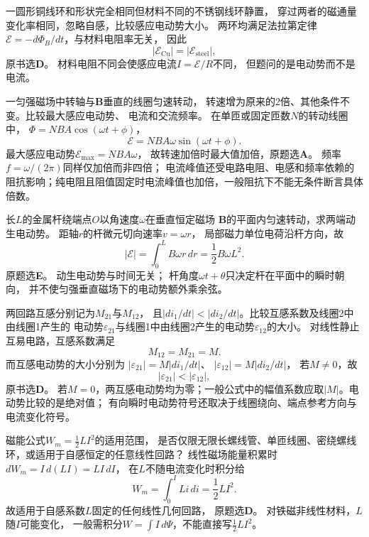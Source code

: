 \problemtext 一圆形铜线环和形状完全相同但材料不同的不锈钢线环静置，
穿过两者的磁通量变化率相同，忽略自感，比较感应电动势大小。
\workings
两环均满足法拉第定律
$\mathcal E=-d\Phi_B/dt$，与材料电阻率无关，
因此
\[
\boxed{|\mathcal E_{\mathrm{Cu}}|
=|\mathcal E_{\mathrm{steel}}|},
\]
原书选\textbf{D}。
\crosscheck 材料电阻不同会使感应电流$I=\mathcal E/R$不同，
但题问的是电动势而不是电流。

\problemtext 一匀强磁场中转轴与$\bm B$垂直的线圈匀速转动，
转速增为原来的2倍、其他条件不变。比较最大感应电动势、
电流和交流频率。
\workings
在单匝或固定匝数$N$的转动线圈中，
$\Phi=NBA\cos(\omega t+\phi)$，
\[
\mathcal E=NBA\omega\sin(\omega t+\phi).
\]
最大感应电动势$\mathcal E_{\max}=NBA\omega$，
故转速加倍时最大值加倍，原题选\textbf{A}。
\crosscheck 频率$f=\omega/(2\pi)$同样仅加倍而非四倍；
电流峰值还受电路电阻、电感和频率依赖的阻抗影响；纯电阻且阻值固定时电流峰值也加倍，一般阻抗下不能无条件断言具体倍数。

\problemtext 长$L$的金属杆绕端点$O$以角速度$\omega$在垂直恒定磁场
$\bm B$的平面内匀速转动，求两端动生电动势。
\workings
距轴$r$的杆微元切向速率$v=\omega r$，
局部磁力单位电荷沿杆方向，故
\[
|\mathcal E|=\int_0^L B\omega r\,dr
=\boxed{\frac12B\omega L^2}.
\]
原题选\textbf{E}。
\crosscheck 动生电动势与时间无关；
杆角度$\omega t+\theta$只决定杆在平面中的瞬时朝向，
并不使匀强垂直磁场下的电动势额外乘余弦。

\problemtext 两回路互感分别记为$M_{21}$与$M_{12}$，
且$|di_1/dt|<|di_2/dt|$。比较互感系数及线圈2中由线圈1产生的
电动势$\varepsilon_{21}$与线圈1中由线圈2产生的电动势$\varepsilon_{12}$的大小。
\workings
对线性静止互易电路，互感系数满足
\[
\boxed{M_{12}=M_{21}=M}.
\]
而互感电动势的大小分别为
$|\varepsilon_{21}|=M|di_1/dt|$、
$|\varepsilon_{12}|=M|di_2/dt|$，
若$M\ne0$，故
\[
\boxed{|\varepsilon_{21}|<|\varepsilon_{12}|},
\]
原书选\textbf{D}。
\crosscheck 若$M=0$，两互感电动势均为零；一般公式中的幅值系数应取$|M|$。电动势比较的是绝对值；
有向瞬时电动势符号还取决于线圈绕向、端点参考方向与电流变化符号。

\problemtext 磁能公式$W_m=\tfrac12LI^2$的适用范围，
是否仅限无限长螺线管、单匝线圈、密绕螺线环，或适用于自感恒定的任意线性回路？
\workings
线性磁场能量积累时
$dW_m=I\,d(LI)=LI\,dI$，
在$L$不随电流变化时积分给
\[
\boxed{W_m=\int_0^I L i\,di=\frac12LI^2}.
\]
故适用于自感系数$L$固定的任何线性几何回路，
原题选\textbf{D}。
\crosscheck 对铁磁非线性材料，$L$随$I$可能变化，
一般需积分$W=\int I\,d\Psi$，不能直接写$\tfrac12LI^2$。

